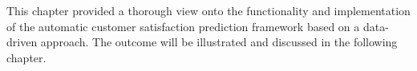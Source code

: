 This chapter provided a thorough view onto the functionality and implementation of the automatic customer satisfaction prediction framework based on a data-driven approach. The outcome will be illustrated and discussed in the following chapter.







 



